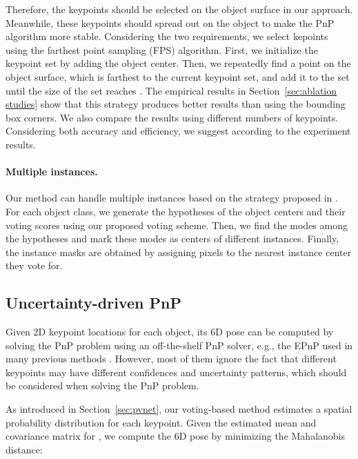 \documentclass[10pt,twocolumn,letterpaper]{article}
\begin{document}
Therefore, the keypoints should be selected on the object surface in our approach. Meanwhile, these keypoints should spread out on the object to make the PnP algorithm more stable. Considering the two requirements, we select  kepoints using the farthest point sampling (FPS) algorithm. First, we initialize the keypoint set by adding the object center. Then, we repeatedly find a point on the object surface, which is farthest to the current keypoint set, and add it to the set until the size of the set reaches . The empirical results in Section~\ref{sec:ablation studies} show that this strategy produces better results than using the bounding box corners. We also compare the results using different numbers of keypoints. Considering both accuracy and efficiency, we suggest  according to the experiment results.




\paragraph{Multiple instances.}

Our method can handle multiple instances based on the strategy proposed in \cite{xiang2017posecnn, papandreou2018personlab}. For each object class, we generate the hypotheses of the object centers and their voting scores using our proposed voting scheme.
Then, we find the modes among the hypotheses and mark these modes as centers of different instances. Finally, the instance masks are obtained by assigning pixels to the nearest instance center they vote for.




\subsection{Uncertainty-driven PnP}
\label{sec:uncertainty-driven pnp}

Given 2D keypoint locations for each object, its 6D pose can be computed by solving the PnP problem using an off-the-shelf PnP solver, e.g., the EPnP \cite{lepetit2009epnp} used in many previous methods \cite{tekin2018real,rad2017bb8}.
However, most of them ignore the fact that different keypoints may have different confidences and uncertainty patterns, which should be considered when solving the PnP problem.      



As introduced in Section~\ref{sec:pvnet}, our voting-based method estimates a spatial probability distribution for each keypoint. Given the estimated mean  and covariance matrix  for , we compute the 6D pose  by minimizing the Mahalanobis distance:
\end{document}

